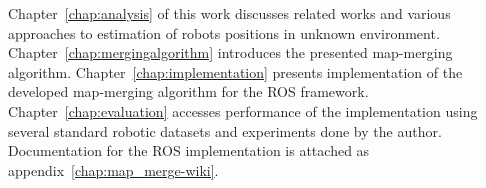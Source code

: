 Chapter~\ref{chap:analysis} of this work discusses related works and various approaches to estimation of robots positions in unknown environment. Chapter~\ref{chap:mergingalgorithm} introduces the presented map-merging algorithm. Chapter~\ref{chap:implementation} presents implementation of the developed map-merging algorithm for the \gls{ROS} framework. Chapter~\ref{chap:evaluation} accesses performance of the implementation using several standard robotic datasets and experiments done by the author. Documentation for the \gls{ROS} implementation is attached as appendix~\ref{chap:map_merge-wiki}.
